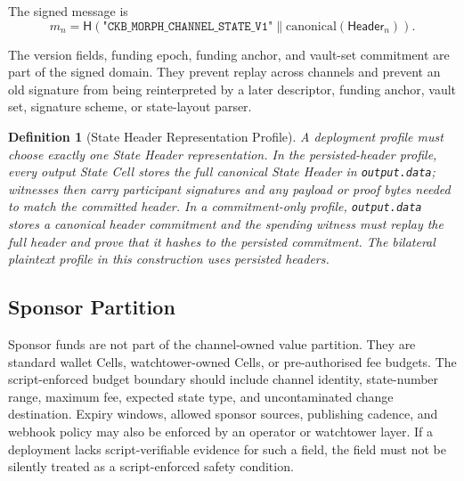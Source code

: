 \documentclass[a4paper,11pt]{article}
\newtheorem{definition}{Definition}
\newcommand{\Header}{\mathsf{Header}}
\newcommand{\hash}{\mathsf{H}}
\begin{document}
The signed message is
\[
m_n =
\hash(\texttt{"CKB\_MORPH\_CHANNEL\_STATE\_V1"}
\parallel \mathrm{canonical}(\Header_n)).
\]

The version fields, funding epoch, funding anchor, and vault-set commitment are part of the signed domain. They prevent replay across channels and prevent an old signature from being reinterpreted by a later descriptor, funding anchor, vault set, signature scheme, or state-layout parser.

\begin{definition}[State Header Representation Profile]
A deployment profile must choose exactly one State Header representation. In
the persisted-header profile, every output State Cell stores the full canonical
State Header in \texttt{output.data}; witnesses then carry participant
signatures and any payload or proof bytes needed to match the committed header.
In a commitment-only profile, \texttt{output.data} stores a canonical header
commitment and the spending witness must replay the full header and prove that
it hashes to the persisted commitment. The bilateral plaintext profile in this
construction uses persisted headers.
\end{definition}

\subsection{Sponsor Partition}

Sponsor funds are not part of the channel-owned value partition. They are standard wallet Cells, watchtower-owned Cells, or pre-authorised fee budgets. The script-enforced budget boundary should include channel identity, state-number range, maximum fee, expected state type, and uncontaminated change destination. Expiry windows, allowed sponsor sources, publishing cadence, and webhook policy may also be enforced by an operator or watchtower layer. If a deployment lacks script-verifiable evidence for such a field, the field must not be silently treated as a script-enforced safety condition.
\end{document}
